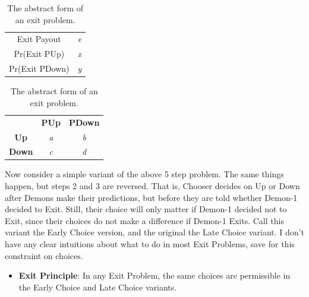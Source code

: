 \documentclass[
  12pt,
  letterpaper,
  DIV=11,
  numbers=noendperiod]{scrreprt}
\providecommand{\tightlist}{%
  \setlength{\itemsep}{0pt}\setlength{\parskip}{0pt}}\usepackage{longtable,booktabs,array}
\begin{document}
\begin{table}

\caption{\label{tbl-general-exit}The abstract form of an exit
problem.}\begin{minipage}[t]{0.50\linewidth}

{\centering 

\begin{tabular}[t]{cc}
\toprule
Exit Payout & \emph{e}\\
Pr(Exit \textbar{} PUp) & \emph{x}\\
Pr(Exit \textbar{} PDown) & \emph{y}\\
\bottomrule
\end{tabular}

}

\end{minipage}%
%
\begin{minipage}[t]{0.50\linewidth}

{\centering 

\begin{tabular}[t]{ccc}
\toprule
 & \textbf{PUp} & \textbf{PDown}\\
\textbf{Up} & \emph{a} & \emph{b}\\
\textbf{Down} & \emph{c} & \emph{d}\\
\bottomrule
\end{tabular}

}

\end{minipage}%

\end{table}

Now consider a simple variant of the above 5 step problem. The same
things happen, but steps 2 and 3 are reversed. That is, Chooser decides
on Up or Down after Demons make their predictions, but before they are
told whether Demon-1 decided to Exit. Still, their choice will only
matter if Demon-1 decided not to Exit, since their choices do not make a
difference if Demon-1 Exits. Call this variant the Early Choice version,
and the original the Late Choice variant. I don't have any clear
intuitions about what to do in most Exit Problems, save for this
constraint on choices.

\begin{itemize}
\tightlist
\item
  \textbf{Exit Principle}: In any Exit Problem, the same choices are
  permissible in the Early Choice and Late Choice variants.
\end{itemize}
\end{document}
